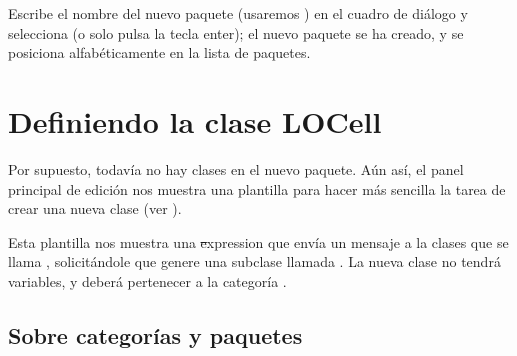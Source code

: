 \documentclass[a4paper,10pt,twoside]{book}
\begin{document}
Escribe el nombre del nuevo paquete (usaremos ) en
el cuadro de di\'alogo y selecciona  (o solo pulsa
la tecla enter); el nuevo paquete se ha creado, y se posiciona alfab\'eticamente
en la lista de paquetes.

\section{Definiendo la clase LOCell}

Por supuesto, todav\'ia no hay clases en el nuevo paquete. A\'un as\'i, el panel
principal de edici\'on nos muestra una plantilla para hacer m\'as sencilla la tarea de crear
una nueva clase (ver ).


Esta plantilla nos muestra una \st expression que env\'ia un mensaje a la clases
que se llama , solicit\'andole que genere una subclase llamada
. La nueva clase no tendr\'a variables, y deber\'a pertenecer
a la categor\'ia .

\subsection{Sobre categor\'ias y paquetes}

\end{document}
